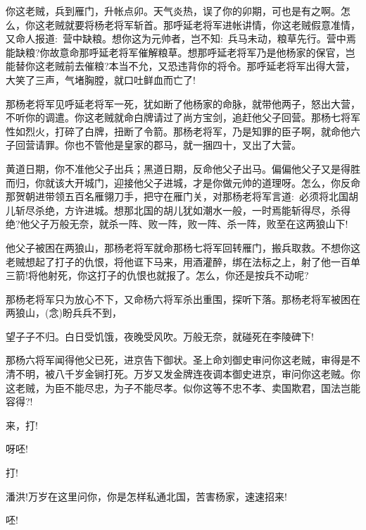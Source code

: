 {{你这老贼，兵到雁门，升帐点卯。天气炎热，误了你的卯期，可也是有之啊。怎么，你这老贼就要将杨老将军斩首。那呼延老将军进帐讲情，你这老贼假意准情，又命人报道:~营中缺粮。想你这为元帅者，岂不知:~兵马未动，粮草先行。营中焉能缺粮?你故意命那呼延老将军催解粮草。想那呼延老将军乃是他杨家的保官，岂能替你这老贼前去催粮?本当不允，又恐违背你的将令。那呼延老将军出得大营，大笑了三声，气堵胸膛，就口吐鲜血而亡了!}

{那杨老将军见呼延老将军一死，犹如断了他杨家的命脉，就带他两子，怒出大营，不听你的调遣。你这老贼就命白牌请过了尚方宝剑，追赶他父子回营。那杨七将军性如烈火，打碎了白牌，扭断了令箭。那杨老将军，乃是知罪的臣子啊，就命他六子回营请罪。你也不管他是皇家的郡马，就一捆四十，叉出了大营。}

{黄道日期，你不准他父子出兵；黑道日期，反命他父子出马。偏偏他父子又是得胜而归，你就该大开城门，迎接他父子进城，才是你做元帅的道理呀。怎么，你反命那贺朝进带领五百名雁翎刀手，把守在雁门关，对那杨老将军言道:~必须将北国胡儿斩尽杀绝，方许进城。想那北国的胡儿犹如潮水一般，一时焉能斩得尽，杀得绝?他父子万般无奈，就杀一阵、败一阵，败一阵、杀一阵，败至在这两狼山下!}

{他父子被困在两狼山，那杨老将军就命那杨七将军回转雁门，搬兵取救。不想你这老贼想起了打子的仇恨，将他诓下马来，用酒灌醉，绑在法标之上，射了他一百单三箭!将他射死，你这打子的仇恨也就报了。怎么，你还是按兵不动呢?}

{那杨老将军只为放心不下，又命杨六将军杀出重围，探听下落。那杨老将军被困在两狼山，({\akai 念})盼兵兵不到，

望子子不归。白日受饥饿，夜晚受风吹。万般无奈，就碰死在李陵碑下!}

{那杨六将军闻得他父已死，进京告下御状。圣上命刘御史审问你这老贼，审得是不清不明，被八千岁金锏打死。万岁又发金牌连夜调本御史进京，审问你这老贼。你这老贼，为臣不能尽忠，为子不能尽孝。似你这等不忠不孝、卖国欺君，国法岂能容得?!}


{来，打!}

{呀呸!}


{打!}

{潘洪!万岁在这里问你，你是怎样私通北国，苦害杨家，速速招来!}

{呸!}


}

